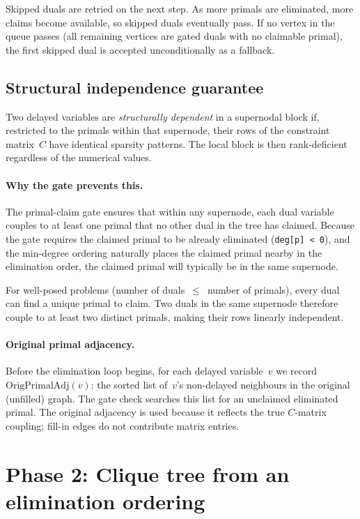 \documentclass[11pt]{article}
\begin{document}
Skipped duals are retried on the next step.  As more primals are
eliminated, more claims become available, so skipped duals eventually
pass.  If no vertex in the queue passes (all remaining vertices are
gated duals with no claimable primal), the first skipped dual is accepted
unconditionally as a fallback.

\subsection{Structural independence guarantee}\label{sec:struct-indep}

Two delayed variables are \emph{structurally dependent} in a supernodal
block if, restricted to the primals within that supernode, their rows of
the constraint matrix~$C$ have identical sparsity patterns.  The local
block is then rank-deficient regardless of the numerical values.

\paragraph{Why the gate prevents this.}
The primal-claim gate ensures that within any supernode, each dual
variable couples to at least one primal that no other dual in the tree
has claimed.  Because the gate requires the claimed primal to be
already eliminated (\texttt{deg[p] < 0}), and the min-degree ordering
naturally places the claimed primal nearby in the elimination order,
the claimed primal will typically be in the same supernode.

For well-posed problems (number of duals~$\le$~number of primals),
every dual can find a unique primal to claim.  Two duals in the same
supernode therefore couple to at least two distinct primals, making
their rows linearly independent.

\paragraph{Original primal adjacency.}
Before the elimination loop begins, for each delayed variable~$v$ we
record $\mathrm{OrigPrimalAdj}(v)$: the sorted list of~$v$'s non-delayed
neighbours in the original (unfilled) graph.  The gate check searches
this list for an unclaimed eliminated primal.  The original adjacency is
used because it reflects the true $C$-matrix coupling; fill-in edges
do not contribute matrix entries.

\section{Phase 2: Clique tree from an elimination ordering}
\end{document}
